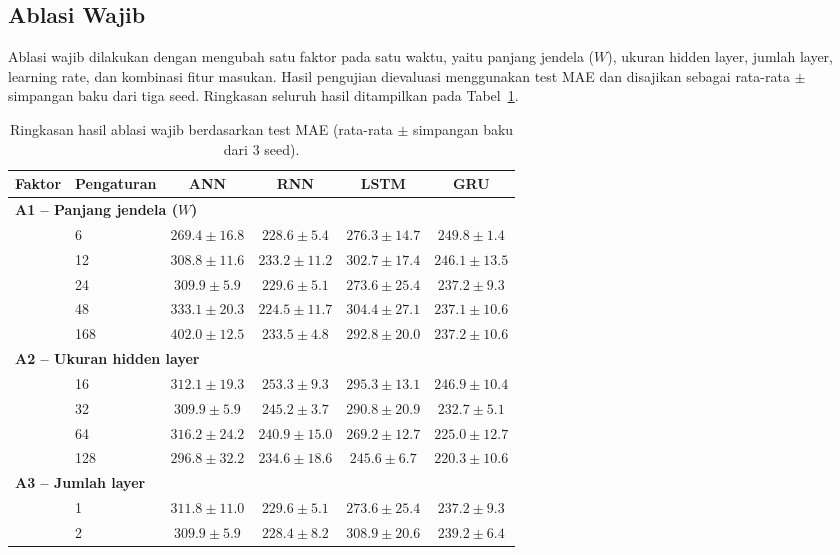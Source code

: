 \documentclass[conference,a4paper]{IEEEtran}
\begin{document}
\subsection{Ablasi Wajib}
Ablasi wajib dilakukan dengan mengubah satu faktor pada satu waktu, yaitu panjang jendela ($W$), ukuran hidden layer, jumlah layer, learning rate, dan kombinasi fitur masukan. Hasil pengujian dievaluasi menggunakan test MAE dan disajikan sebagai rata-rata $\pm$ simpangan baku dari tiga seed. Ringkasan seluruh hasil ditampilkan pada Tabel~\ref{tab:ablasi-gabungan}.

\begin{table}[ht]
\centering
\caption{Ringkasan hasil ablasi wajib berdasarkan test MAE (rata-rata $\pm$ simpangan baku dari 3 seed).}
\label{tab:ablasi-gabungan}
\scriptsize
\begin{tabular}{@{}llcccc@{}}
\toprule
Faktor & Pengaturan & ANN & RNN & LSTM & GRU \\
\midrule
\multicolumn{6}{l}{\textbf{A1 -- Panjang jendela ($W$)}}\\
& 6 & $269.4 \pm 16.8$ & $228.6 \pm 5.4$ & $276.3 \pm 14.7$ & $249.8 \pm 1.4$\\
& 12 & $308.8 \pm 11.6$ & $233.2 \pm 11.2$ & $302.7 \pm 17.4$ & $246.1 \pm 13.5$\\
& 24 & $309.9 \pm 5.9$ & $229.6 \pm 5.1$ & $273.6 \pm 25.4$ & $237.2 \pm 9.3$\\
& 48 & $333.1 \pm 20.3$ & $\mathbf{224.5 \pm 11.7}$ & $304.4 \pm 27.1$ & $\mathbf{237.1 \pm 10.6}$\\
& 168 & $402.0 \pm 12.5$ & $233.5 \pm 4.8$ & $292.8 \pm 20.0$ & $237.2 \pm 10.6$\\
\midrule
\multicolumn{6}{l}{\textbf{A2 -- Ukuran hidden layer}}\\
& 16 & $312.1 \pm 19.3$ & $253.3 \pm 9.3$ & $295.3 \pm 13.1$ & $246.9 \pm 10.4$\\
& 32 & $309.9 \pm 5.9$ & $245.2 \pm 3.7$ & $290.8 \pm 20.9$ & $232.7 \pm 5.1$\\
& 64 & $316.2 \pm 24.2$ & $240.9 \pm 15.0$ & $269.2 \pm 12.7$ & $225.0 \pm 12.7$\\
& 128 & $\mathbf{296.8 \pm 32.2}$ & $\mathbf{234.6 \pm 18.6}$ & $\mathbf{245.6 \pm 6.7}$ & $\mathbf{220.3 \pm 10.6}$\\
\midrule
\multicolumn{6}{l}{\textbf{A3 -- Jumlah layer}}\\
& 1 & $311.8 \pm 11.0$ & $229.6 \pm 5.1$ & $\mathbf{273.6 \pm 25.4}$ & $\mathbf{237.2 \pm 9.3}$\\
& 2 & $309.9 \pm 5.9$ & $\mathbf{228.4 \pm 8.2}$ & $308.9 \pm 20.6$ & $239.2 \pm 6.4$\\

\end{tabular}
\end{table}
\end{document}
